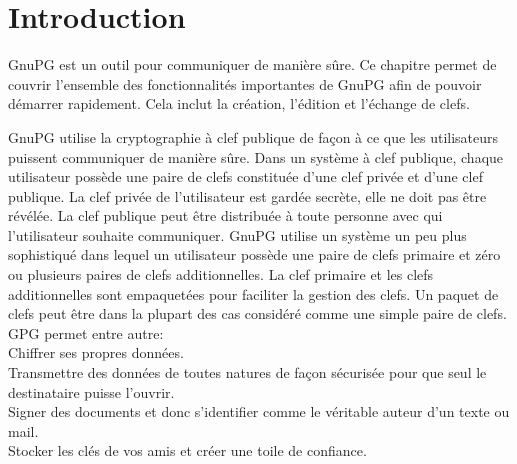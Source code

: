 \section{Introduction}

GnuPG est un outil pour communiquer de manière sûre. Ce chapitre permet de couvrir l'ensemble des fonctionnalités 
importantes de GnuPG afin de pouvoir démarrer rapidement. Cela inclut la création, l'édition et l'échange de clefs.

GnuPG utilise la cryptographie à clef publique de façon à ce que les utilisateurs puissent communiquer de manière sûre. 
Dans un système à clef publique, chaque utilisateur possède une paire de clefs constituée d'une clef privée et d'une clef publique. 
La clef privée de l'utilisateur est gardée secrète, elle ne doit pas être révélée. La clef publique peut être distribuée à toute personne
avec qui l'utilisateur souhaite communiquer. GnuPG utilise un système un peu plus sophistiqué dans lequel un utilisateur possède 
une paire de clefs primaire et zéro ou plusieurs paires de clefs additionnelles. La clef primaire et les clefs additionnelles sont 
empaquetées pour faciliter la gestion des clefs. Un paquet de clefs peut être dans la plupart des cas considéré comme une simple paire 
de clefs.\\

GPG permet entre autre: \\
Chiffrer ses propres données.\\
Transmettre des données de toutes natures de façon sécurisée pour que seul le destinataire puisse l'ouvrir.\\
Signer des documents et donc s'identifier comme le véritable auteur d'un texte ou mail.\\
Stocker les clés de vos amis et créer une toile de confiance.
